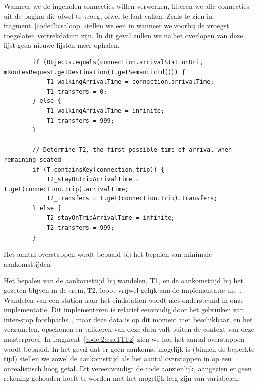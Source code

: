 Wanneer we de ingeladen connecties willen verwerken, filteren we alle connecties uit de pagina die ofwel te vroeg, ofwel te laat vallen. Zoals te zien in fragment~\ref{code:2:csaloop} stellen we een  in wanneer we voorbij de vroegst toegelaten vertrekdatum zijn. In dit geval zullen we na het overlopen van deze lijst geen nieuwe lijsten meer ophalen. 

\begin{listing}[htb]
	\begin{verbatim}
	 	if (Objects.equals(connection.arrivalStationUri, mRoutesRequest.getDestination().getSemanticId())) {
			T1_walkingArrivalTime = connection.arrivalTime;
			T1_transfers = 0;
		} else {
			T1_walkingArrivalTime = infinite;
			T1_transfers = 999;
		}

		// Determine T2, the first possible time of arrival when remaining seated
		if (T.containsKey(connection.trip)) {
			T2_stayOnTripArrivalTime = T.get(connection.trip).arrivalTime;
			T2_transfers = T.get(connection.trip).transfers;
		} else {
			T2_stayOnTripArrivalTime = infinite;
			T2_transfers = 999;
		}	
		\end{verbatim}
					\caption[CSA: Bepalen van aankomsttijden]{Het aantal overstappen wordt bepaald bij het bepalen van minimale aankomsttijden}
		\label{code:2:csaT1T2}
\end{listing}

Het bepalen van de aankomsttijd bij wandelen, T1, en de aankomsttijd bij het gezeten blijven in de trein, T2, loopt vrijwel gelijk aan de implementatie uit~\cite{strasser17}. Wandelen van een station naar het eindstation wordt niet ondersteund in onze implementatie. Dit implementeren is relatief eenvoudig door het gebruiken van inter-stop foothpaths~\citep{strasser17,hannemann08}, maar deze data is op dit moment niet beschikbaar, en het verzamelen, opschonen en valideren van deze data valt buiten de context van deze masterproef. In fragment~\ref{code:2:csaT1T2} zien we hoe het aantal overstappen wordt bepaald. In het geval dat er geen aankomst mogelijk is (binnen de beperkte tijd) stellen we zowel de aankomsttijd als het aantal overstappen in op een onrealistisch hoog getal. Dit vereenvoudigt de code aanzienlijk, aangezien er geen rekening gehouden hoeft te worden met het mogelijk leeg zijn van variabelen.

